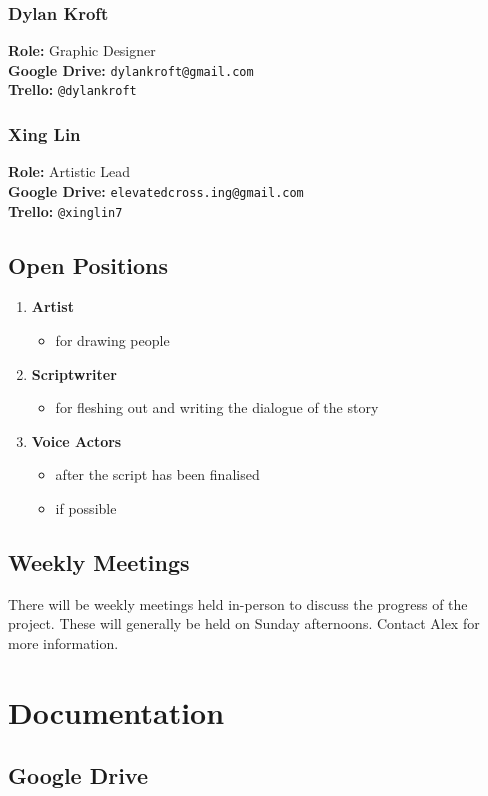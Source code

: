 \documentclass[11pt]{article}
\begin{document}
\subsubsection{Dylan Kroft}
\textbf{Role:} Graphic Designer\\
\textbf{Google Drive:} \lstinline{dylankroft@gmail.com}\\
\textbf{Trello:} \lstinline{@dylankroft}\\
\subsubsection{Xing Lin}
\textbf{Role:} Artistic Lead\\
\textbf{Google Drive:} \lstinline{elevatedcross.ing@gmail.com}\\
\textbf{Trello:} \lstinline{@xinglin7}\\
\subsection{Open Positions}
\begin{enumerate}
\item \textbf{Artist}
\begin{itemize}
\item for drawing people
\end{itemize}
\item \textbf{Scriptwriter}
\begin{itemize}
\item for fleshing out and writing the dialogue of the story
\end{itemize}
\item \textbf{Voice Actors}
\begin{itemize}
\item after the script has been finalised
\item if possible
\end{itemize}
\end{enumerate}
\subsection{Weekly Meetings}
There will be weekly meetings held in-person to discuss the progress of the project. These will generally be held on Sunday afternoons. Contact Alex for more information.
\section{Documentation}
\subsection{Google Drive}
\end{document}
